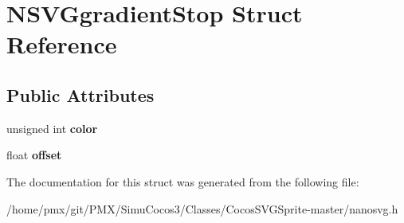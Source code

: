 \hypertarget{structNSVGgradientStop}{}\section{N\+S\+V\+Ggradient\+Stop Struct Reference}
\label{structNSVGgradientStop}
\subsection*{Public Attributes}
\begin{DoxyCompactItemize}
\item 
\mbox{\label{structNSVGgradientStop_ab27a56ac1f6bbf9e60d8b6247c1a9cc8}} 
unsigned int {\bfseries color}
\item 
\mbox{\label{structNSVGgradientStop_af6bb631bbcac76b8217595e3ad3ae979}} 
float {\bfseries offset}
\end{DoxyCompactItemize}


The documentation for this struct was generated from the following file\+:\begin{DoxyCompactItemize}
\item 
/home/pmx/git/\+P\+M\+X/\+Simu\+Cocos3/\+Classes/\+Cocos\+S\+V\+G\+Sprite-\/master/nanosvg.\+h\end{DoxyCompactItemize}

